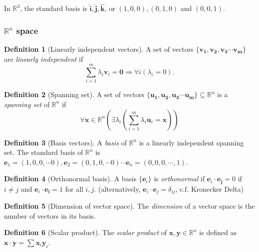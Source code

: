 \documentclass[a4paper]{article}
\theoremstyle{definition}
\newtheorem*{defi}{Definition}
\newcommand{\mb}[1]{\mathbf{#1}}
\newcommand{\R}{\mathbb{R}}
\begin{document}
In $\R^3$, the standard basis is $\mb{\hat{i}, \hat{j}, \hat{k}}$, or $(1, 0, 0), (0, 1, 0)$ and $(0, 0, 1)$.
\subsubsection{\texorpdfstring{$\R^n$}{Rn} space}
\begin{defi}[Linearly independent vectors]
  A set of vectors $\{\mb{v_1, v_2, v_3\cdots v_m}\}$ are \emph{linearly independent} if
\[
\sum_{i = 1}^m\lambda_i\mb{v}_i = \mb{0} \Rightarrow \forall i(\lambda_i = 0).
\]
\end{defi}
\begin{defi}[Spanning set]
  A set of vectors $\{\mb{u_1, u_2, u_3\cdots u_m}\}\subseteq \R^n$ is a \emph{spanning set} of $\R^n$ if
  \[
  \forall \mb{x} \in \R^n\left(\exists \lambda_i\left(\sum_{i = 1}^m\lambda_i\mb{u}_i = \mb{x}\right)\right)
  \]
\end{defi}

\begin{defi}[Basis vectors]
  A \emph{basis} of $\R^n$ is a linearly independent spanning set. The standard basis of $\R^n$ is $\mb{e}_1 = (1, 0, 0, \cdots 0), \mb{e}_2 = (0, 1, 0, \cdots 0)\cdots \mb{e}_n = (0, 0, 0, \cdots, 1)$.
\end{defi}

\begin{defi}[Orthonormal basis]
  A basis $\{\mb{e}_i\}$ is \emph{orthonormal} if $\mb{e}_i\cdot \mb{e_j} = 0$ if $i\not= j$ and $\mb{e}_i\cdot \mb{e_i} = 1$ for all $i, j$. (alternatively, $\mb{e}_i\cdot \mb{e}_j = \delta_{ij}$, c.f. Kronecker Delta)
\end{defi}

\begin{defi}[Dimension of vector space]
  The \emph{dimension} of a vector space is the number of vectors in its basis. 
\end{defi}
\begin{defi}[Scalar product]
  The \emph{scalar product} of $\mb{x, y}\in \R^n$ is defined as $\mb{x\cdot y} = \sum \mb{x}_i\mb{y}_i$.
\end{defi}
\end{document}
